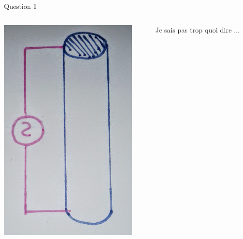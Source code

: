 \documentclass{beamer}
\begin{document}
\begin{frame}{Question 1}
	\begin{columns}
		\begin{column}{0.40\textwidth}
			\begin{center}
	    		\includegraphics[scale=0.2, angle=90]{Question1-2.png}
        		\end{center}
        	\end{column}
        	\begin{column}{0.40\textwidth}
			\begin{center}
	    Je sais pas trop quoi dire ...
        	\end{center}
        	\end{column}
        	\end{columns}
\end{frame}
\end{document}

